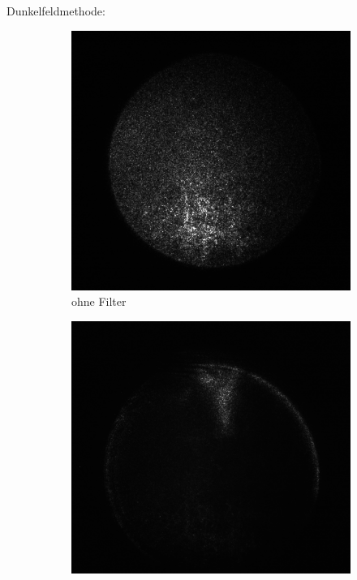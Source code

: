 \documentclass[
	a4paper,
	12pt,
	pagesize,
	ngerman
]{scrartcl}
\begin{document}
	\noindent Dunkelfeldmethode:
		\begin{figure}[H]
        \centering
				\begin{subfigure}[b]{0.475\textwidth}
            \centering
            \includegraphics[width=\textwidth]{raw/4/4_k_ohne_filter_crop}
            \caption%
            {ohne Filter}
            \label{fig_air_ohne}
        \end{subfigure}
				\begin{subfigure}[b]{0.475\textwidth}
            \centering
            \includegraphics[width=\textwidth]{raw/4/4_k4_crop}

\end{subfigure}
\end{figure}
\end{document}
